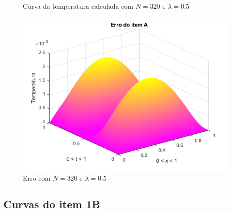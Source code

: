 \documentclass[12pt]{article}
\begin{document}
\begin{spacing}{1.5}
\begin{figure}
    \caption{Curva da temperatura calculada com $N=320$ e $\lambda=0.5$}
    \label{fig:A_n320lambda0-5_calc}
\end{figure}
\begin{figure}
    \centering
    \includegraphics[width=0.8\linewidth]{Primeira_Tarefa/ItemA/n320_lambda0-5_erro.png}
    \caption{Erro com $N=320$ e $\lambda=0.5$}
    \label{fig:A_n320lambda0-5_erro}
\end{figure}


\clearpage
\subsection{Curvas do item 1B} \label{curvas1B}


\end{spacing}
\end{document}
